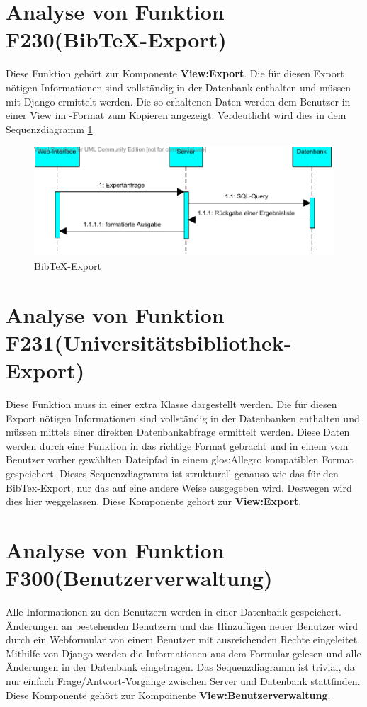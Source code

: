 \section{Analyse von Funktion F230(Bib\TeX -Export)}
Diese Funktion gehört zur Komponente \textbf{View:Export}. Die für diesen Export nötigen Informationen sind vollständig in der Datenbank enthalten und müssen mit Django ermittelt werden. Die so erhaltenen Daten werden dem Benutzer in einer View im \BibTeX -Format zum Kopieren angezeigt. Verdeutlicht wird dies in dem Sequenzdiagramm \ref{fig:BibTeX-Export}.

\begin{figure}[h]
\includegraphics[width=0.8\linewidth]{bilder/Seq-BibTex.pdf}
\caption[BibTeX-Export]{BibTeX-Export}
\label{fig:BibTeX-Export}
\end{figure}

\section{Analyse von Funktion F231(Universitätsbibliothek-Export)}
Diese Funktion muss in einer extra Klasse dargestellt werden. Die für diesen Export nötigen Informationen sind vollständig in der Datenbanken enthalten und müssen mittels einer direkten Datenbankabfrage ermittelt werden. Diese Daten werden durch eine Funktion in das richtige Format gebracht und in einem vom Benutzer vorher gewählten Dateipfad in einem \Gls{glos:Allegro} kompatiblen Format gespeichert. Dieses Sequenzdiagramm ist strukturell genauso wie das für den BibTex-Export, nur das auf eine andere Weise ausgegeben wird. Deswegen wird dies hier weggelassen. Diese Komponente gehört zur \textbf{View:Export}.

\section{Analyse von Funktion F300(Benutzerverwaltung)}
Alle Informationen zu den Benutzern werden in einer Datenbank gespeichert. Änderungen an bestehenden Benutzern und das Hinzufügen neuer Benutzer wird durch ein Webformular von einem Benutzer mit ausreichenden Rechte eingeleitet. Mithilfe von Django werden die Informationen aus dem Formular gelesen und alle Änderungen in der Datenbank eingetragen. Das Sequenzdiagramm ist trivial, da nur einfach Frage/Antwort-Vorgänge zwischen Server und Datenbank stattfinden. Diese Komponente gehört zur Kompoinente \textbf{View:Benutzerverwaltung}.

